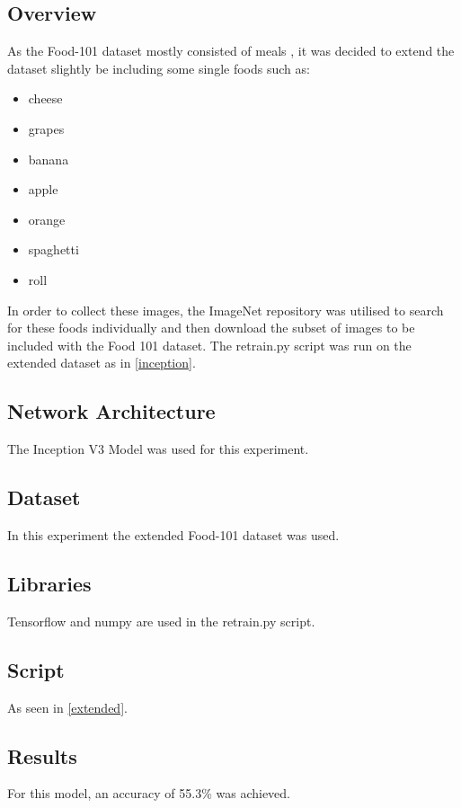 \subsection*{Overview}
As the Food-101 dataset mostly consisted of meals \textcite{food101}, it was decided to extend the
dataset slightly be including some single foods such as:
\begin{itemize}
    \item{cheese}
    \item{grapes}
    \item{banana}
    \item{apple}
    \item{orange}
    \item{spaghetti}
    \item{roll}
\end{itemize}

In order to collect these images, the ImageNet repository was utilised to search for
these foods individually and then download the subset of images to be included
with the Food 101 dataset\textcite{imagenet}. The retrain.py script was run on the extended dataset as in
\ref{inception}.

\subsection*{Network Architecture}
The Inception V3 Model was used for this experiment.

\subsection*{Dataset}
In this experiment the extended Food-101 dataset was used.

\subsection*{Libraries}
Tensorflow and numpy are used in the retrain.py script.

\subsection*{Script}
As seen in \ref{extended}.

\subsection*{Results}
For this model, an accuracy of 55.3\% was achieved.

